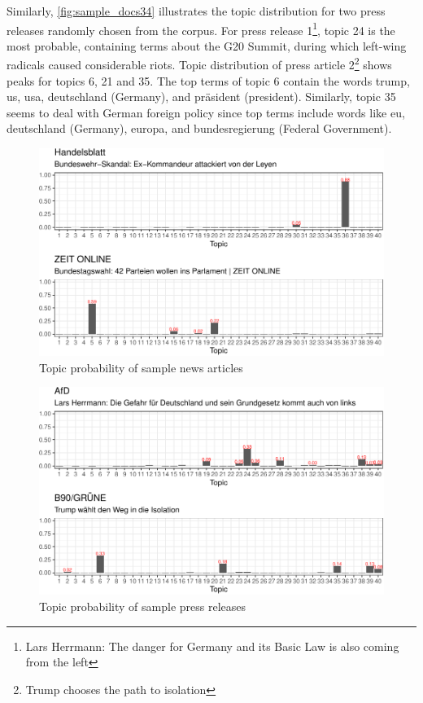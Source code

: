 \documentclass[
  12pt,
]{article}
\begin{document}
Similarly, \autoref{fig:sample_docs34} illustrates the topic
distribution for two press releases randomly chosen from the corpus. For
press release 1\footnote{Lars Herrmann: The danger for Germany and its
  Basic Law is also coming from the left}, topic 24 is the most
probable, containing terms about the G20 Summit, during which left-wing
radicals caused considerable riots. Topic distribution of press article
2\footnote{Trump chooses the path to isolation} shows peaks for topics
6, 21 and 35. The top terms of topic 6 contain the words trump, us, usa,
deutschland (Germany), and präsident (president). Similarly, topic 35
seems to deal with German foreign policy since top terms include words
like eu, deutschland (Germany), europa, and bundesregierung (Federal
Government).

\begin{figure}

{\centering \includegraphics[width=0.9\linewidth]{chap1_files/figure-latex/News articles sample documents-1} 

}

\caption{Topic probability of sample news articles \label{fig:sample_docs12}}\label{fig:News articles sample documents}
\end{figure}

\begin{figure}

{\centering \includegraphics[width=0.9\linewidth]{chap1_files/figure-latex/Press releases sample documents-1} 

}

\caption{Topic probability of sample press releases \label{fig:sample_docs34}}\label{fig:Press releases sample documents}
\end{figure}
\end{document}
